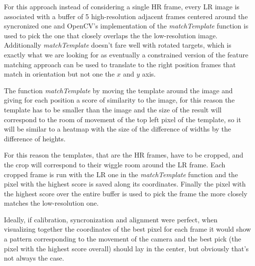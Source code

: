 For this approach instead of considering a single HR frame, every LR image is associated with a buffer of 5 high-resolution adjacent frames centered around the syncronized one and OpenCV's implementation of the \emph{matchTemplate} function is used to pick the one that closely overlaps the the low-resolution image. Additionally \emph{matchTemplate} doesn't fare well with rotated targets, which is exactly what we are looking for as eventually a constrained version of the feature matching approach can be used to translate to the right position frames that match in orientation but not one the \(x\) and \(y\) axis.\newline

The function \emph{matchTemplate} by moving the template around the image and giving for each position a score of similarity to the image, for this reason the template has to be smaller than the image and the size of the result will correspond to the room of movement of the top left pixel of the template, so it will be similar to a heatmap with the size of the difference of widths by the difference of heights.

For this reason the templates, that are the HR frames, have to be cropped, and the crop will correspond to their wiggle room around the LR frame. Each cropped frame is run with the LR one in the \emph{matchTemplate} function and the pixel with the highest score is saved along its coordinates. Finally the pixel with the highest score over the entire buffer is used to pick the frame the more closely matches the low-resolution one.

Ideally, if calibration, syncronization and alignment were perfect, when visualizing together the coordinates of the best pixel for each frame it would show a pattern corresponding to the movement of the camera and the best pick (the pixel with the highest score overall) should lay in the center, but obviously that's not always the case.


